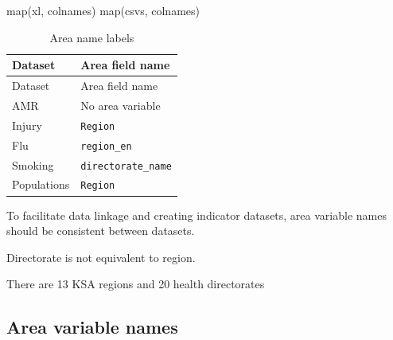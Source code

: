 \documentclass[
  letterpaper,
  DIV=11,
  numbers=noendperiod]{scrreprt}
\newenvironment{Shaded}{\begin{snugshade}}{\end{snugshade}}
\newcommand{\AttributeTok}[1]{\textcolor[rgb]{0.40,0.45,0.13}{#1}}
\newcommand{\CommentTok}[1]{\textcolor[rgb]{0.37,0.37,0.37}{#1}}
\newcommand{\DocumentationTok}[1]{\textcolor[rgb]{0.37,0.37,0.37}{\textit{#1}}}
\newcommand{\FunctionTok}[1]{\textcolor[rgb]{0.28,0.35,0.67}{#1}}
\newcommand{\NormalTok}[1]{\textcolor[rgb]{0.00,0.23,0.31}{#1}}
\newcommand{\OtherTok}[1]{\textcolor[rgb]{0.00,0.23,0.31}{#1}}
\newcommand{\SpecialCharTok}[1]{\textcolor[rgb]{0.37,0.37,0.37}{#1}}
\newcommand{\StringTok}[1]{\textcolor[rgb]{0.13,0.47,0.30}{#1}}
\begin{document}
\begin{Shaded}
\begin{Highlighting}[]
\FunctionTok{map}\NormalTok{(xl, colnames)}
\FunctionTok{map}\NormalTok{(csvs, colnames)}
\end{Highlighting}
\end{Shaded}

\begin{longtable}[]{@{}ll@{}}
\caption{Area name labels}\tabularnewline
\toprule\noalign{}
Dataset & Area field name \\
\midrule\noalign{}
\endfirsthead
\toprule\noalign{}
Dataset & Area field name \\
\midrule\noalign{}
\endhead
\bottomrule\noalign{}
\endlastfoot
AMR & No area variable \\
Injury & \texttt{Region} \\
Flu & \texttt{region\_en} \\
Smoking & \texttt{directorate\_name} \\
Populations & \texttt{Region} \\
\end{longtable}

To facilitate data linkage and creating indicator datasets, area
variable names should be consistent between datasets.

Directorate is not equivalent to region.

There are 13 KSA regions and 20 health directorates

\subsection{Area variable names}\label{area-variable-names}

\begin{Shaded}
\end{Shaded}
\end{document}
